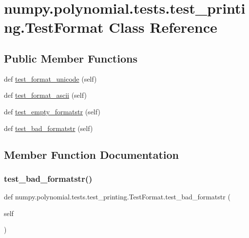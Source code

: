 \hypertarget{classnumpy_1_1polynomial_1_1tests_1_1test__printing_1_1TestFormat}{}\section{numpy.\+polynomial.\+tests.\+test\+\_\+printing.\+Test\+Format Class Reference}
\label{classnumpy_1_1polynomial_1_1tests_1_1test__printing_1_1TestFormat}
\subsection*{Public Member Functions}
\begin{DoxyCompactItemize}
\item 
def \hyperlink{classnumpy_1_1polynomial_1_1tests_1_1test__printing_1_1TestFormat_a6327baeb06f303449d4481198dc98ff8}{test\+\_\+format\+\_\+unicode} (self)
\item 
def \hyperlink{classnumpy_1_1polynomial_1_1tests_1_1test__printing_1_1TestFormat_a99fb4f8c668070648cd22168a6e54c9e}{test\+\_\+format\+\_\+ascii} (self)
\item 
def \hyperlink{classnumpy_1_1polynomial_1_1tests_1_1test__printing_1_1TestFormat_a7aebb9a2939c4250baec9ba909056910}{test\+\_\+empty\+\_\+formatstr} (self)
\item 
def \hyperlink{classnumpy_1_1polynomial_1_1tests_1_1test__printing_1_1TestFormat_af5c8671c9927ac40e653d9220c9b1219}{test\+\_\+bad\+\_\+formatstr} (self)
\end{DoxyCompactItemize}


\subsection{Member Function Documentation}
\mbox{\label{classnumpy_1_1polynomial_1_1tests_1_1test__printing_1_1TestFormat_af5c8671c9927ac40e653d9220c9b1219}} 
\subsubsection{\texorpdfstring{test\+\_\+bad\+\_\+formatstr()}{test\_bad\_formatstr()}}
{\footnotesize\ttfamily def numpy.\+polynomial.\+tests.\+test\+\_\+printing.\+Test\+Format.\+test\+\_\+bad\+\_\+formatstr (\begin{DoxyParamCaption}\item[{}]{self }\end{DoxyParamCaption})}

